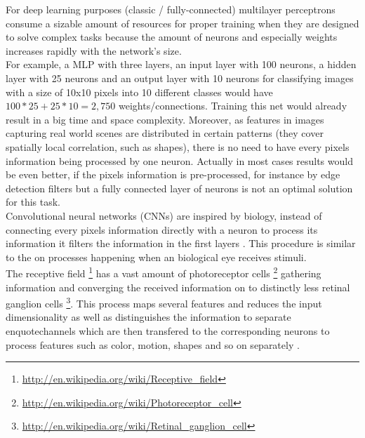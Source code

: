 \documentclass[12pt,twoside]{article}
\theoremstyle{plain}
\theoremstyle{definition}
\theoremstyle{remark}
\begin{document}
For deep learning purposes (classic / fully-connected) multilayer perceptrons consume a sizable amount of resources for proper training when they are designed to solve complex tasks because the amount of neurons and especially weights increases rapidly with the network's size.
\\
For example, a MLP with three layers, an input layer with 100 neurons, a hidden layer with 25 neurons and an output layer with 10 neurons for classifying images with a size of 10x10 pixels into 10 different classes would have $100 * 25 + 25 * 10 = 2,750$ weights/connections. Training this net would already result in a big time and space complexity. Moreover, as features in images capturing real world scenes are distributed in certain patterns (they cover spatially local correlation, such as shapes), there is no need to have every pixels information being processed by one neuron. Actually in most cases results would be even better, if the pixels information is pre-processed, for instance by edge detection filters but a fully connected layer of neurons is not an optimal solution for this task.
\\
Convolutional neural networks (CNNs) are inspired by biology, instead of connecting every pixels information directly with a neuron to process its information it filters the information in the first layers \cite{ImangeNetClassificationCNN-Krizhevsky}. This procedure is similar to the on processes happening when an biological eye receives stimuli.
\\
The receptive field \footnote{\url{http://en.wikipedia.org/wiki/Receptive_field}} has a vast amount of photoreceptor cells \footnote{\url{http://en.wikipedia.org/wiki/Photoreceptor_cell}} gathering information and converging the received information on to distinctly less retinal ganglion cells \footnote{\url{http://en.wikipedia.org/wiki/Retinal_ganglion_cell}}. This process maps several features and reduces the input dimensionality as well as distinguishes the information to separate enquote{channels} which are then transfered to the corresponding neurons to process features such as color, motion, shapes and so on separately \cite{DeepHierarchiesVisualCortex-kruger}.
\end{document}
